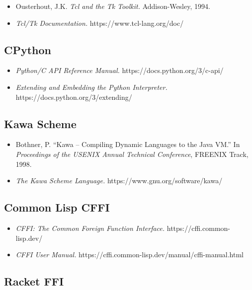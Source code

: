 \documentclass[
  12pt,
]{report}
\begin{document}
\begin{itemize}
\item
  Ousterhout, J.K. \emph{Tcl and the Tk Toolkit.} Addison-Wesley, 1994.
\item
  \emph{Tcl/Tk Documentation.} https://www.tcl-lang.org/doc/
\end{itemize}

\subsection{CPython}\label{cpython}

\begin{itemize}
\item
  \emph{Python/C API Reference Manual.} https://docs.python.org/3/c-api/
\item
  \emph{Extending and Embedding the Python Interpreter.}
  https://docs.python.org/3/extending/
\end{itemize}

\subsection{Kawa Scheme}\label{kawa-scheme}

\begin{itemize}
\item
  Bothner, P. ``Kawa -- Compiling Dynamic Languages to the Java VM.'' In
  \emph{Proceedings of the USENIX Annual Technical Conference}, FREENIX
  Track, 1998.
\item
  \emph{The Kawa Scheme Language.} https://www.gnu.org/software/kawa/
\end{itemize}

\subsection{Common Lisp CFFI}\label{common-lisp-cffi-1}

\begin{itemize}
\item
  \emph{CFFI: The Common Foreign Function Interface.}
  https://cffi.common-lisp.dev/
\item
  \emph{CFFI User Manual.}
  https://cffi.common-lisp.dev/manual/cffi-manual.html
\end{itemize}

\subsection{Racket FFI}\label{racket-ffi-1}
\end{document}
